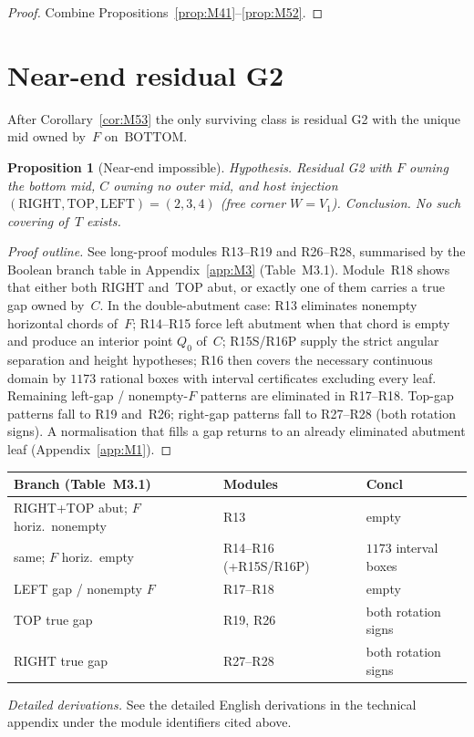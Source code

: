 \documentclass[11pt,reqno]{amsart}
\newtheorem{proposition}[theorem]{Proposition}
\theoremstyle{definition}
\newcommand{\BOTTOM}{\mathrm{BOTTOM}}
\newcommand{\RIGHT}{\mathrm{RIGHT}}
\newcommand{\TOP}{\mathrm{TOP}}
\newcommand{\LEFT}{\mathrm{LEFT}}
\begin{document}
\begin{proof}
Combine Propositions~\ref{prop:M41}--\ref{prop:M52}.
\end{proof}



\section{Near-end residual G2}\label{sec:near}

After Corollary~\ref{cor:M53} the only surviving class is residual G2 with the
unique mid owned by~$F$ on~$\BOTTOM$.

\begin{proposition}[Near-end impossible]\label{prop:M61}
\emph{Hypothesis.} Residual G2 with $F$ owning the bottom mid, $C$ owning no
outer mid, and host injection $(\RIGHT,\TOP,\LEFT)=(2,3,4)$ (free corner
$W=V_1$).
\emph{Conclusion.} No such covering of~$T$ exists.
\end{proposition}

\begin{proof}[Proof outline]
See long-proof modules R13--R19 and R26--R28, summarised by the Boolean
branch table in Appendix~\ref{app:M3} (Table~M3.1).  Module~R18 shows that
either both $\RIGHT$ and~$\TOP$ abut, or exactly one of them carries a true
gap owned by~$C$.  In the double-abutment case: R13 eliminates nonempty
horizontal chords of~$F$; R14--R15 force left abutment when that chord is
empty and produce an interior point $Q_0$ of~$C$; R15S/R16P supply the
strict angular separation and height hypotheses; R16 then covers the
necessary continuous domain by $1173$ rational boxes with interval
certificates excluding every leaf.  Remaining left-gap / nonempty-$F$
patterns are eliminated in R17--R18.  Top-gap patterns fall to R19 and~R26;
right-gap patterns fall to R27--R28 (both rotation signs).  A normalisation
that fills a gap returns to an already eliminated abutment leaf
(Appendix~\ref{app:M1}).
\end{proof}

\begin{center}
\small
\begin{tabular}{@{}p{}p{}p{}@{}}
\toprule
Branch (Table~M3.1) & Modules & Concl \\
\midrule
RIGHT+TOP abut; $F$ horiz.\ nonempty & R13 & empty \\
same; $F$ horiz.\ empty & R14--R16 (+R15S/R16P) & $1173$ interval boxes \\
LEFT gap / nonempty $F$ & R17--R18 & empty \\
TOP true gap & R19, R26 & both rotation signs \\
RIGHT true gap & R27--R28 & both rotation signs \\
\bottomrule
\end{tabular}
\end{center}
\smallskip
\noindent\emph{Detailed derivations.} See the detailed English derivations in the technical appendix under the module identifiers cited above.
\end{document}
